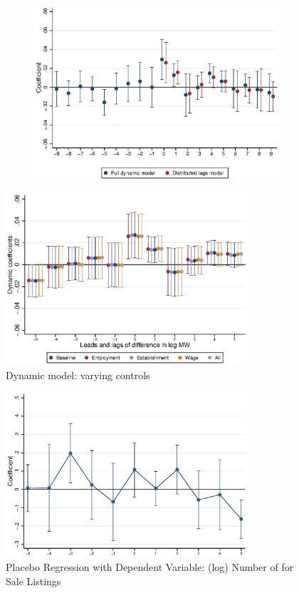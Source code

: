 \documentclass{article}
\begin{document}
\begin{figure}[htb!]
\begin{subfigure}[b]{0.5\textwidth}
		\includegraphics[width = \textwidth]
		{../../analysis/first_differences/output/fd_models_coeffs_w9.eps}
	\end{subfigure}
\end{figure}

\begin{figure} \centering
	\caption{Dynamic model: varying controls}
	\includegraphics[width = 0.8\textwidth]{../../analysis/first_differences/output/fd_models_control.eps}
\end{figure} 

\clearpage 
\begin{figure}[htb!]\centering
	\caption{Placebo Regression with Dependent Variable: (log) Number of for Sale Listings}
	\label{fig:placebo_nlist}
	\includegraphics[width = 0.8\textwidth]{../../analysis/first_differences_nlist/output/fd_placebo.eps}	
\end{figure}
\end{document}
